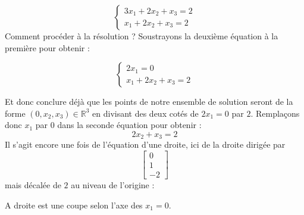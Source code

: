 $$ \begin{cases}3x_1 + 2x_2 + x_3 = 2\\x_1 + 2x_2 + x_3 = 2 \end{cases}$$
Comment procéder à la résolution ? Soustrayons la deuxième équation à la première pour obtenir :

$$ \begin{cases}2x_1  = 0\\ x_1 + 2x_2 + x_3 = 2 \end{cases}$$

\noindent Et donc conclure déjà que les points de notre ensemble de solution seront de la forme $(0, x_2, x_3)\in \mathbb{R}^3$ en divisant des deux cotés de $ 2x_1  = 0$ par $2$. Remplaçons donc $x_1$ par $0$ dans la seconde équation pour obtenir :
$$ 2x_2 + x_3 = 2 $$
\noindent Il s'agit encore une fois de l'équation d'une droite, ici de la droite dirigée par $$\begin{bmatrix}0 \\ 1 \\ -2 \end{bmatrix}$$ mais décalée de $2$ au niveau de l'origine :
\\
\hspace{1CM}
A droite est une coupe selon l'axe des $x_1 = 0$. 
